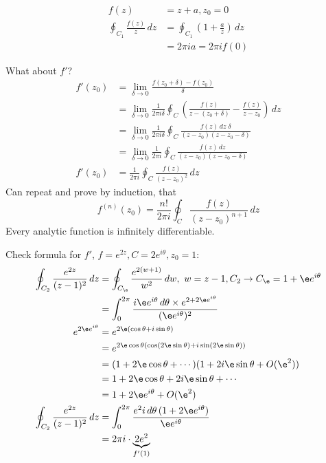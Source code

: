 \documentclass[a4paper, 11pt, normalem]{report}
\begin{document}
\begin{example}[Checking]
    \begin{align}
        f(z) &= z+a,z_0 = 0 \\
        \oint_{C_1} \frac{f(z)}{z}\,dz &= \oint_{C_1} \left(1 + \frac{a}{z}\right)\,dz \\
                                       &= 2\pi ia = 2\pi if(0)
    \end{align}
\end{example}

What about $f'$?
\begin{align}
    f'(z_0) &= \lim_{\delta \to 0} \frac{f(z_0 + \delta) - f(z_0)}{\delta} \\
            &= \lim_{\delta \to 0} \frac{1}{2\pi i\delta}\oint_C \left(\frac{f(z)}{z-(z_0+\delta)} - \frac{f(z)}{z - z_0}\right)\,dz \\
            &= \lim_{\delta\to 0} \frac{1}{2\pi i\delta} \oint_C \frac{f(z)\,dz\;\delta}{(z-z_0)(z-z_0-\delta)} \\
            &= \lim_{\delta\to 0} \frac{1}{2\pi i} \oint_C \frac{f(z)\,dz}{(z-z_0)(z-z_0-\delta)} \\
    f'(z_0) &= \frac{1}{2\pi i} \oint_C \frac{f(z)}{(z-z_0)^2}\,dz
\end{align}
Can repeat and prove by induction, that
\begin{equation}
    f^{(n)}(z_0) = \frac{n!}{2\pi i} \oint_C \frac{f(z)}{(z-z_0)^{n+1}}\,dz
\end{equation}
Every analytic function is infinitely differentiable.

\begin{example}
Check formula for $f'$, $f = e^{2z}, C = 2e^{i\theta}, z_0 = 1$:
    \begin{align}
        \oint_{C_2} \frac{e^{2z}}{(z-1)^2}\,dz &= \oint_{C_\e} \frac{e^{2(w+1)}}{w^2}\,dw,~ w = z-1, C_2 \to C_{\e} = 1 + \e e^{i\theta} \\
                                               &= \int_{0}^{2\pi} \frac{i\e e^{i\theta}\,d\theta \times e^{2 + 2\e e^{i\theta}}}{(\e e^{i\theta})^2} \\
        e^{2\e e^{i\theta}} &= e^{2\e(\cos\theta + i\sin\theta)} \\
                            &= e^{2\e\cos\theta(\cos(2\e\sin\theta) + i\sin(2\e\sin\theta))} \\
                            &= (1 + 2\e\cos\theta + \cdots)(1 + 2i\e\sin\theta + O(\e^2)) \\
                            &= 1 + 2\e\cos\theta + 2i\e\sin\theta + \cdots \\
                            &= 1 + 2\e e^{i\theta} + O(\e^2) \\
        \oint_{C_2} \frac{e^{2z}}{(z-1)^2}\,dz &= \int_0^{2\pi} \frac{e^2i\,d\theta\,(1 + 2\e e^{i\theta})}{\e e^{i\theta}} \\
                                               &= 2\pi i \cdot \underbrace{2e^2}_{f'(1)}
    \end{align}
\end{example}
\end{document}
